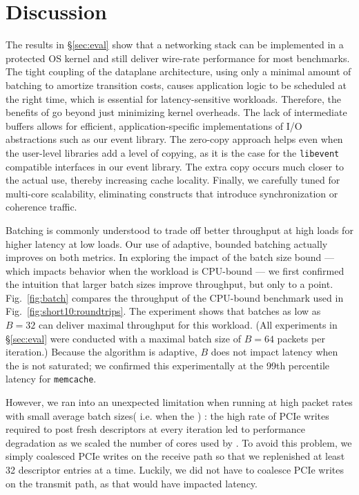 
\section{Discussion}
\label{sec:disc}


 The results in \S\ref{sec:eval}
show that a networking stack can be implemented in a protected OS
kernel and still deliver wire-rate performance for most benchmarks.
The tight coupling of the dataplane architecture, using only a minimal
amount of batching to amortize transition costs, causes application
logic to be scheduled at the right time, which is essential for
latency-sensitive workloads.  Therefore, the benefits of \ix go beyond
just minimizing kernel overheads. The lack of intermediate buffers
allows for efficient, application-specific implementations of I/O
abstractions such as our event library. The zero-copy approach helps
even when the user-level libraries add a level of copying, as it is
the case for the \texttt{libevent} compatible interfaces in our event
library.  The extra copy occurs much closer to the actual use, thereby
increasing cache locality.  Finally, we carefully tuned \ix for
multi-core scalability, eliminating constructs that introduce
synchronization or coherence traffic.



Batching is commonly understood to trade off better throughput at high
loads for higher latency at low loads.  Our use of adaptive, bounded
batching actually improves on both metrics. In exploring the impact of
the batch size bound --- which impacts behavior when the workload is
CPU-bound --- we first confirmed the intuition that larger batch
sizes improve throughput, but only to a point. Fig.~\ref{fig:batch}
compares the throughput of the CPU-bound benchmark used in
Fig.~\ref{fig:short10:roundtrips}.  The experiment shows that batches
as low as $B=32$ can deliver maximal throughput for this
workload. (All experiments in \S\ref{sec:eval} were conducted with a
maximal batch size of $B=64$ packets per iteration.)  Because the
algorithm is adaptive, $B$ does not impact latency when the 
is not saturated; we confirmed
this experimentally at the 99th percentile latency for
\texttt{memcache}.

However, we ran into an unexpected  limitation
when running \ix at high packet rates with small average batch sizes(
i.e. when the ) : the high rate of PCIe writes required to post fresh
descriptors at every iteration led to performance degradation as we
scaled the number of cores used by \ix.  To avoid this problem, we
simply coalesced PCIe writes on the receive path so that we
replenished at least 32 descriptor entries at a time.  Luckily, we did
not have to coalesce PCIe writes on the transmit path, as that would
have impacted latency.


